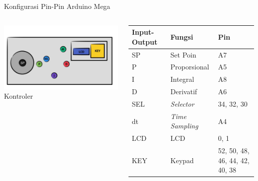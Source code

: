 \documentclass[10pt,xcolor={dvipsnames}]{beamer}
\begin{document}
\begin{frame}{Konfigurasi Pin-Pin Arduino Mega}
	\begin{columns}[T]
		\begin{column}{0.48\textwidth}
			\centering
			\includegraphics[width=8cm]{Gambar Lain/KONTORU.jpg}
			Kontroler
		\end{column}
		\begin{column}{0.48\textwidth}
			\begin{tabular}{ | m{1cm} | m{2cm}| m{2cm}|} 
				\hline
				\textbf{Input-Output} & \textbf{Fungsi} & \textbf{Pin} \\ 
				\hline
				SP & Set Poin & A7\\ 
				\hline
				P & Proporsional & A5 \\
				\hline
				I & Integral & A8 \\
				\hline
				D & Derivatif & A6 \\
				\hline
				SEL & \textit{Selector} & 34, 32, 30 \\
				\hline
				dt & \textit{Time Sampling} & A4 \\
				\hline
				LCD & LCD & 0, 1 \\
				\hline
				KEY & Keypad & 52, 50, 48, 46, 44, 42, 40, 38 \\
				\hline
			\end{tabular}
		\end{column}
	\end{columns}
\end{frame}
\end{document}
